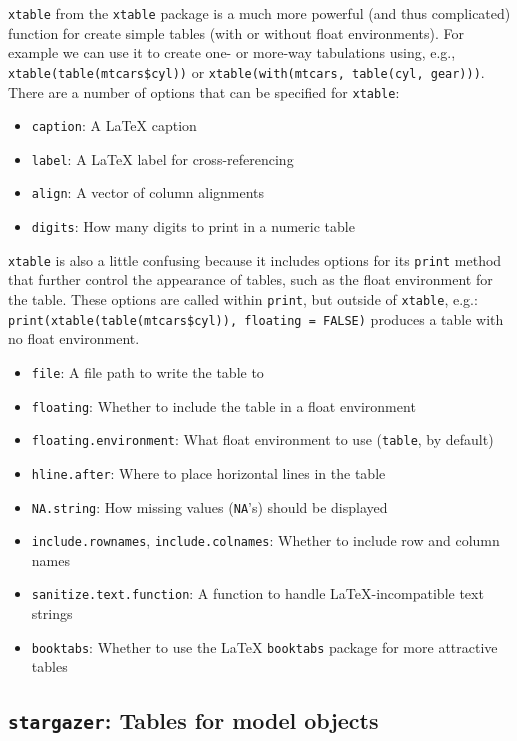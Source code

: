 \documentclass[11pt, a4paper]{article}
\begin{document}
\texttt{xtable} from the \texttt{xtable} package is a much more powerful (and thus complicated) function for create simple tables (with or without float environments). For example we can use it to create one- or more-way tabulations using, e.g., \verb|xtable(table(mtcars$cyl))| or \verb|xtable(with(mtcars, table(cyl, gear)))|. There are a number of options that can be specified for \texttt{xtable}:

\begin{itemize}
\item \texttt{caption}: A \LaTeX{} caption
\item \texttt{label}: A \LaTeX{} label for cross-referencing
\item \texttt{align}: A vector of column alignments
\item \texttt{digits}: How many digits to print in a numeric table
\end{itemize}

\noindent \texttt{xtable} is also a little confusing because it includes options for its \texttt{print} method that further control the appearance of tables, such as the float environment for the table. These options are called within \texttt{print}, but outside of \texttt{xtable}, e.g.: \verb|print(xtable(table(mtcars$cyl)), floating = FALSE)| produces a table with no float environment.

\begin{itemize}
\item \texttt{file}: A file path to write the table to
\item \texttt{floating}: Whether to include the table in a float environment
\item \texttt{floating.environment}: What float environment to use (\texttt{table}, by default)
\item \texttt{hline.after}: Where to place horizontal lines in the table
\item \texttt{NA.string}: How missing values (\texttt{NA}'s) should be displayed
\item \texttt{include.rownames}, \texttt{include.colnames}: Whether to include row and column names
\item \texttt{sanitize.text.function}: A function to handle \LaTeX{}-incompatible text strings
\item \texttt{booktabs}: Whether to use the \LaTeX{} \texttt{booktabs} package for more attractive tables
\end{itemize}


\pagebreak
\subsection*{\texttt{stargazer}: Tables for model objects}
\end{document}
